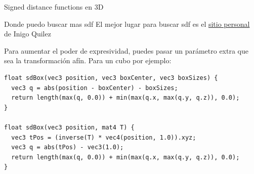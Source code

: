 \begin{frame}[fragile]{Signed distance functions en 3D}
\begin{block}{Donde puedo buscar mas sdf}
    El mejor lugar para buscar sdf es el \href{https://iquilezles.org/articles/distfunctions/}{sitio personal} de Inigo Quilez
\end{block}
Para aumentar el poder de expresividad, puedes pasar un parámetro extra que sea la transformación afín.
Para un cubo por ejemplo:
\begin{listing}
\begin{verbatim}
float sdBox(vec3 position, vec3 boxCenter, vec3 boxSizes) {
  vec3 q = abs(position - boxCenter) - boxSizes;
  return length(max(q, 0.0)) + min(max(q.x, max(q.y, q.z)), 0.0);
}

float sdBox(vec3 position, mat4 T) {
  vec3 tPos = (inverse(T) * vec4(position, 1.0)).xyz;
  vec3 q = abs(tPos) - vec3(1.0);
  return length(max(q, 0.0)) + min(max(q.x, max(q.y, q.z)), 0.0);
}
\end{verbatim}
\end{listing}

\end{frame}

